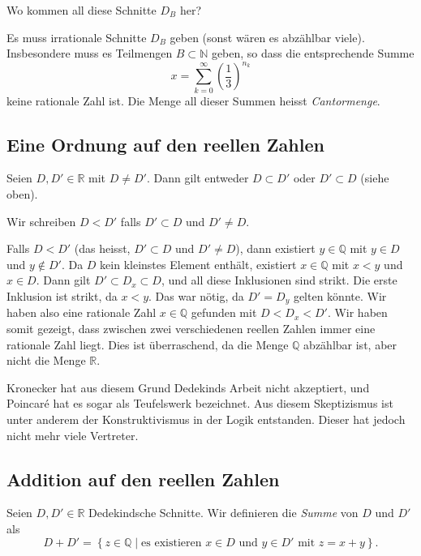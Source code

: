 \documentclass[../main.tex]{subfiles}
\begin{document}
\begin{question}
  Wo kommen all diese Schnitte $D_{B}$ her?
\end{question}

Es muss irrationale Schnitte $D_{B}$ geben (sonst wären es abzählbar viele).
Insbesondere muss es Teilmengen $B \subset \mathbb N$ geben, so dass die
entsprechende Summe
\[x = \sum_{k=0}^{\infty} {\left(\frac{1}{3}\right)}^{n_{k}}\]
keine rationale Zahl ist.
Die Menge all dieser Summen heisst \emph{Cantormenge}.

\subsection*{Eine Ordnung auf den reellen Zahlen}
Seien $D, D' \in \mathbb R$ mit $D \neq D'$. Dann gilt entweder
$D \subset D'$ oder $D' \subset D$ (siehe oben).
\begin{definition}
  Wir schreiben $D < D'$ falls $D' \subset D$ und $D' \neq D$.
\end{definition}

\begin{remark}
  Falls $D < D'$ (das heisst, $D' \subset D$ und $D' \neq D$), dann
  existiert $y \in \mathbb Q$ mit $y \in D$ und $y \notin D'$.
  Da $D$ kein kleinstes Element enthält,
  existiert $x \in \mathbb Q$ mit $x < y$ und $x \in D$.
  Dann gilt $D' \subset D_{x} \subset D$, und all diese
  Inklusionen sind strikt. Die erste Inklusion ist strikt,
  da $x < y$. Das war nötig, da $D' = D_{y}$
  gelten könnte. Wir haben also eine rationale Zahl
  $x \in \mathbb Q$ gefunden mit
  $D < D_{x} < D'$.
  Wir haben somit gezeigt, dass zwischen zwei verschiedenen reellen
  Zahlen immer eine rationale Zahl liegt.
  Dies ist überraschend, da die Menge $\mathbb Q$
  abzählbar ist, aber nicht die Menge $\mathbb R$.

  Kronecker hat aus diesem Grund Dedekinds Arbeit nicht akzeptiert,
  und Poincaré hat es sogar als Teufelswerk bezeichnet.
  Aus diesem Skeptizismus ist unter anderem der
  Konstruktivismus in der Logik entstanden.
  Dieser hat jedoch nicht mehr viele Vertreter.
\end{remark}

\subsection*{Addition auf den reellen Zahlen}

\begin{definition}
Seien $D, D' \in \mathbb R$ Dedekindsche Schnitte.
Wir definieren die \emph{Summe} von $D$ und $D'$ als
\[D + D' = \left\{z \in \mathbb Q \mid \text{es existieren }
    x \in D \text{ und } y \in D' \text{ mit } z = x + y\right\}.\]
\end{definition}
\end{document}
